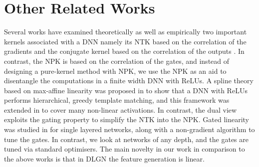 \section{Other Related Works}
Several works have examined theoretically as well as empirically two important kernels associated with a DNN namely its NTK based on the correlation of the gradients and the conjugate kernel based on the correlation of the outputs \citep{spectra,laplace,belkin,genntk,disentangling,label,ntk,arora2019exact,convgp,fcgp,lee2020finite,nth}. In contrast, the NPK is based on the correlation of the gates, and instead of designing a pure-kernel method with NPK, we use the NPK as an aid to disentangle the computations in a finite width DNN with ReLUs.  %
A spline theory based on max-affine linearity was proposed in \citep{balestriero2018spline} to show that a DNN with ReLUs performs hierarchical, greedy template matching, and this framework was extended in \citep{balestriero2018hard} to cover many non-linear activations. In contrast, the dual view exploits the gating property to simplify the NTK into the NPK. Gated linearity was studied in \citep{sss} for single layered networks, along with a non-gradient algorithm to tune the gates. In contrast, we look at networks of any depth, and the gates are tuned via standard optimisers. The main novelty in our work in comparison to the above works is that in DLGN the feature generation is linear.

